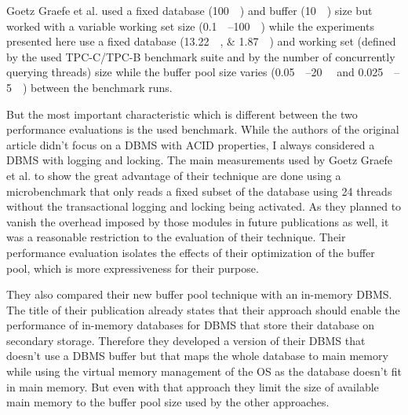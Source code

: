 	Goetz Graefe et al. used a fixed database (\SI{100}{\giga\byte}) and buffer (\SI{10}{\giga\byte}) size but worked with a variable working set size (\SIrange{0.1}{100}{\giga\byte}) while the experiments presented here use a fixed database (\SIlist{13.22;1.87}{\gibi\byte}) and working set (defined by the used TPC-C/TPC-B benchmark suite and by the number of concurrently querying threads) size while the buffer pool size varies (\SIrange{0.05}{20}{\gibi\byte} and \SIrange{0.025}{5}{\gibi\byte}) between the benchmark runs.
	
	But the most important characteristic which is different between the two performance evaluations is the used benchmark. While the authors of the original article didn't focus on a DBMS with ACID properties, I always considered a DBMS with logging and locking. The main measurements used by Goetz Graefe et al. to show the great advantage of their technique are done using a microbenchmark that only reads a fixed subset of the database using 24 threads without the transactional logging and locking being activated. As they planned to vanish the overhead imposed by those modules in future publications as well, it was a reasonable restriction to the evaluation of their technique. Their performance evaluation isolates the effects of their optimization of the buffer pool, which is more expressiveness for their purpose.
	
	They also compared their new buffer pool technique with an in-memory DBMS. The title of their publication already states that their approach should enable the performance of in-memory databases for DBMS that store their database on secondary storage. Therefore they developed a version of their DBMS that doesn't use a DBMS buffer but that maps the whole database to main memory while using the virtual memory management of the OS as the database doesn't fit in main memory. But even with that approach they limit the size of available main memory to the buffer pool size used by the other approaches.

